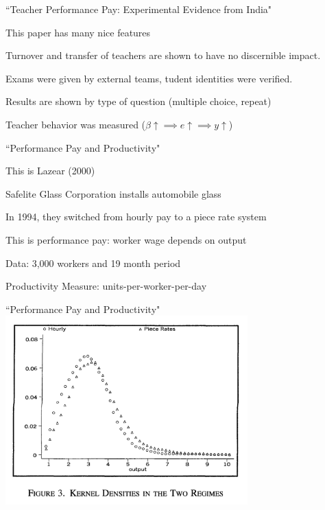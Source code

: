 \documentclass[aspectratio=169,usenames,dvipsnames]{beamer}
\newenvironment{wideitemize}{\itemize\addtolength{\itemsep}{10pt}}{\enditemize}
\begin{document}
\begin{frame}{``Teacher Performance Pay: Experimental Evidence from India"}
    \begin{wideitemize}
        \item This paper has many nice features\pause
        \item Turnover and transfer of teachers are shown to have no discernible impact.
        \item Exams were given by external teams, tudent identities were verified.
        \item Results are shown by type of question (multiple choice, repeat)
        \item Teacher behavior was measured ($\beta \uparrow \implies e\uparrow \implies y \uparrow$)
    \end{wideitemize}
\end{frame}


\begin{frame}{``Performance Pay and Productivity"}
    \begin{wideitemize}
        \item This is Lazear (2000)
        \item Safelite Glass Corporation installs automobile glass
        \item In 1994, they switched from hourly pay to a piece rate system
        \item This is performance pay: worker wage depends on output
        \item Data: 3,000 workers and 19 month period
        \item Productivity Measure: units-per-worker-per-day
    \end{wideitemize}
\end{frame}



\begin{frame}{``Performance Pay and Productivity"}
\centering
    \includegraphics[width=0.7\textwidth]{pictures/safelite.png}
\end{frame}
\end{document}
